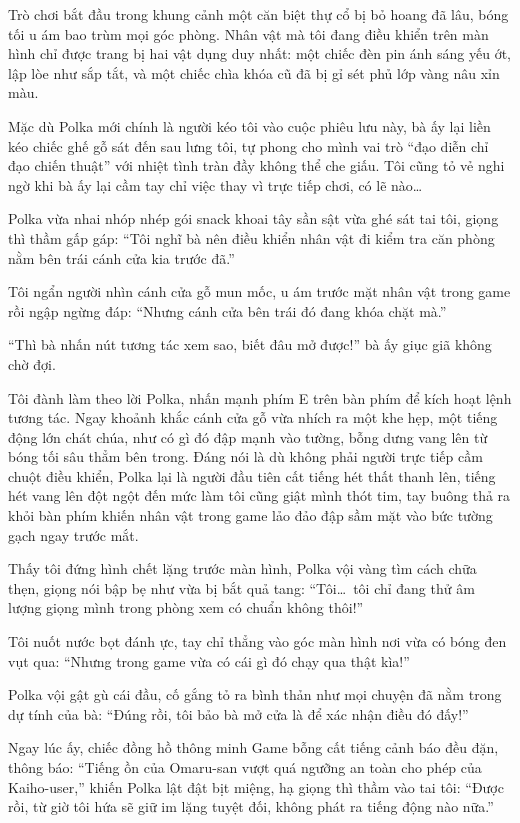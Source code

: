 \documentclass[../main.tex]{subfiles}
\begin{document}
\ct

Trò chơi bắt đầu trong khung cảnh một căn biệt thự cổ bị bỏ hoang đã lâu, bóng tối u ám bao trùm mọi góc phòng. Nhân vật mà tôi đang điều khiển trên màn hình chỉ được trang bị hai vật dụng duy nhất: một chiếc đèn pin ánh sáng yếu ớt, lập lòe như sắp tắt, và một chiếc chìa khóa cũ đã bị gỉ sét phủ lớp vàng nâu xỉn màu.

Mặc dù Polka mới chính là người kéo tôi vào cuộc phiêu lưu này, bà ấy lại liền kéo chiếc ghế gỗ sát đến sau lưng tôi, tự phong cho mình vai trò ``đạo diễn chỉ đạo chiến thuật'' với nhiệt tình tràn đầy không thể che giấu. Tôi cũng tỏ vẻ nghi ngờ khi bà ấy lại cầm tay chỉ việc thay vì trực tiếp chơi, có lẽ nào\dots

Polka vừa nhai nhóp nhép gói snack khoai tây sần sật vừa ghé sát tai tôi, giọng thì thầm gấp gáp: ``Tôi nghĩ bà nên điều khiển nhân vật đi kiểm tra căn phòng nằm bên trái cánh cửa kia trước đã.''

Tôi ngẩn người nhìn cánh cửa gỗ mun mốc, u ám trước mặt nhân vật trong game rồi ngập ngừng đáp: ``Nhưng cánh cửa bên trái đó đang khóa chặt mà.''

``Thì bà nhấn nút tương tác xem sao, biết đâu mở được!'' bà ấy giục giã không chờ đợi.

Tôi đành làm theo lời Polka, nhấn mạnh phím E trên bàn phím để kích hoạt lệnh tương tác. Ngay khoảnh khắc cánh cửa gỗ vừa nhích ra một khe hẹp, một tiếng động lớn chát chúa, như có gì đó đập mạnh vào tường, bỗng dưng vang lên từ bóng tối sâu thẳm bên trong. Đáng nói là dù không phải người trực tiếp cầm chuột điều khiển, Polka lại là người đầu tiên cất tiếng hét thất thanh lên, tiếng hét vang lên đột ngột đến mức làm tôi cũng giật mình thót tim, tay buông thả ra khỏi bàn phím khiến nhân vật trong game lảo đảo đập sầm mặt vào bức tường gạch ngay trước mắt.

Thấy tôi đứng hình chết lặng trước màn hình, Polka vội vàng tìm cách chữa thẹn, giọng nói bập bẹ như vừa bị bắt quả tang: ``Tôi\dots\ tôi chỉ đang thử âm lượng giọng mình trong phòng xem có chuẩn không thôi!''

Tôi nuốt nước bọt đánh ực, tay chỉ thẳng vào góc màn hình nơi vừa có bóng đen vụt qua: ``Nhưng trong game vừa có cái gì đó chạy qua thật kìa!''

Polka vội gật gù cái đầu, cố gắng tỏ ra bình thản như mọi chuyện đã nằm trong dự tính của bà: ``Đúng rồi, tôi bảo bà mở cửa là để xác nhận điều đó đấy!''

Ngay lúc ấy, chiếc đồng hồ thông minh Game bỗng cất tiếng cảnh báo đều đặn, thông báo: ``Tiếng ồn của Omaru-san vượt quá ngưỡng an toàn cho phép của Kaiho-user,'' khiến Polka lật đật bịt miệng, hạ giọng thì thầm vào tai tôi: ``Được rồi, từ giờ tôi hứa sẽ giữ im lặng tuyệt đối, không phát ra tiếng động nào nữa.''
\end{document}
